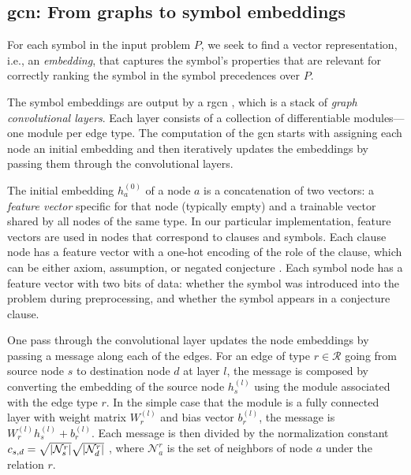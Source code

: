 \subsection{\Gls{gcn}: From graphs to symbol embeddings}
\label{sec:gcn}

For each symbol in the input problem $P$,
we seek to find a vector representation, i.e., an \emph{embedding},
that captures the symbol's properties that are relevant
for correctly ranking the symbol in the symbol precedences over $P$.

The symbol embeddings are output by a \gls{rgcn} \cite{Schlichtkrull2017},
which is a stack of \emph{graph convolutional layers}.
Each layer consists of a collection of differentiable modules---one module per edge type.
The computation of the \gls{gcn} starts with assigning each node an initial embedding
and then iteratively updates the embeddings by passing them through the convolutional layers.

The initial embedding $h_a^{(0)}$ of a node $a$ is a concatenation of two vectors:
a \emph{feature vector} specific for that node (typically empty)
and a trainable vector shared by all nodes of the same type.
In our particular implementation,
feature vectors are used in nodes that correspond to clauses and symbols.
Each clause node has a feature vector with a one-hot encoding of the role of the clause,
which can be either axiom, assumption, or negated conjecture \cite{TptpSyntax,Sutcliffe2017}.
Each symbol node has a feature vector with two bits of data:
whether the symbol was introduced into the problem during preprocessing,
and whether the symbol appears in a conjecture clause.

One pass through the convolutional layer
updates the node embeddings by passing a message along each of the edges.
For an edge of type $r \in \mathcal{R}$ going from source node $s$ to destination node $d$ at layer $l$,
the message is composed by converting the embedding of the source node $h_s^{(l)}$
using the module associated with the edge type $r$.
In the simple case that the module is a fully connected layer with weight matrix $W_r^{(l)}$ and bias vector $b_r^{(l)}$,
the message is $W_r^{(l)} h_s^{(l)} + b_r^{(l)}$.
Each message is then divided by the normalization constant
$c_{s,d} = \sqrt{\left|\mathcal{N}_s^r\right|} \sqrt{\left|\mathcal{N}_d^r\right|}$ \cite{kipf2017semisupervised},
where $\mathcal{N}_a^r$ is the set of neighbors of node $a$ under the relation $r$.

